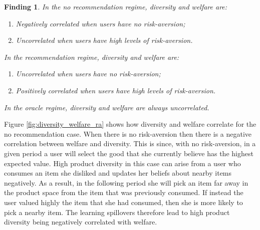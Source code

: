 \documentclass[sigconf, anonymous, review]{acmart}
\newtheorem{finding}{Finding}
\begin{document}
\begin{finding}\label{finding_diversity_welfare_corr}
In the no recommendation regime, diversity and welfare are:
\begin{enumerate}
\item Negatively correlated when users have no risk-aversion;
\item Uncorrelated when users have high levels of risk-aversion.
\end{enumerate}
In the recommendation regime, diversity and welfare are:
\begin{enumerate}
\item Uncorrelated when users have no risk-aversion;
\item Positively correlated when users have high levels of risk-aversion.
\end{enumerate}
In the oracle regime, diversity and welfare are always uncorrelated.
\end{finding}

Figure \ref{fig:diversity_welfare_ra} shows how diversity and welfare correlate for the no recommendation case. When there is no risk-aversion then there is a negative correlation between welfare and diversity. This is since, with no risk-aversion, in a given period a user will select the good that she currently believe has the highest expected value. High product diversity in this case can arise from a user who consumes an item she disliked and updates her beliefs about nearby items negatively. As a result, in the following period she will pick an item far away in the product space from the item that was previously consumed. If instead the user valued highly the item that she had consumed, then she is more likely to pick a nearby item. The learning spillovers therefore lead to high product diversity being negatively correlated with welfare.
\par




\end{document}
